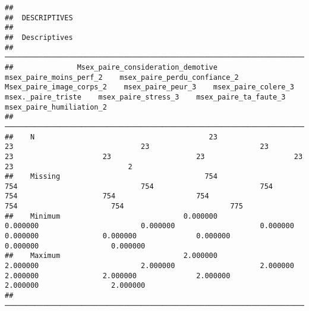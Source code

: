 \documentclass[
]{article}
\begin{document}
\begin{verbatim}
## 
##  DESCRIPTIVES
## 
##  Descriptives                                                                                                                                                                                                                                                                          
##  ───────────────────────────────────────────────────────────────────────────────────────────────────────────────────────────────────────────────────────────────────────────────────────────────────────────────────────────────────────────────────────────────────────────────────── 
##               Msex_paire_consideration_demotive    msex_paire_moins_perf_2    msex_paire_perdu_confiance_2    Msex_paire_image_corps_2    msex_paire_peur_3    msex_paire_colere_3    msex._paire_triste    msex_paire_stress_3    msex_paire_ta_faute_3    msex_paire_humiliation_2   
##  ───────────────────────────────────────────────────────────────────────────────────────────────────────────────────────────────────────────────────────────────────────────────────────────────────────────────────────────────────────────────────────────────────────────────────── 
##    N                                         23                         23                              23                          23                   23                     23                    23                     23                       23                           2   
##    Missing                                  754                        754                             754                         754                  754                    754                   754                    754                      754                         775   
##    Minimum                             0.000000                   0.000000                        0.000000                    0.000000             0.000000               0.000000              0.000000               0.000000                 0.000000                               
##    Maximum                             2.000000                   2.000000                        2.000000                    2.000000             2.000000               2.000000              2.000000               2.000000                 2.000000                               
##  ─────────────────────────────────────────────────────────────────────────────────────────────────────────────────────────────────────────────────────────────────────────────────────────────────────────────────────────────────────────────────────────────────────────────────────
\end{verbatim}
\end{document}
